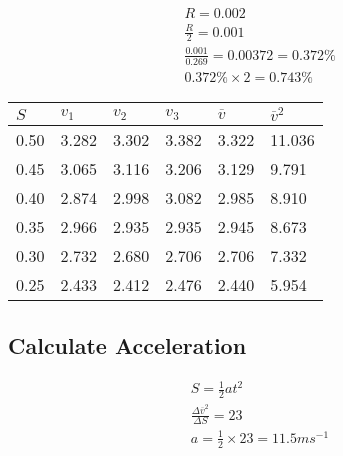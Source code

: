 \documentclass{article}
\begin{document}
\begin{gather}
	R = 0.002 \\
	\frac{R}{2} = 0.001 \\
    \frac{0.001}{0.269} = 0.00372 = 0.372\% \\
	0.372\% \times 2 = 0.743\%
\end{gather}

\begin{center}
    \begin{tabular}{l|l|l|l|l|l}
     $S$ & $v_1$ & $v_2$ & $v_3$ & $\overline{v}$ & ${\overline{v}}^2$\\ \hline
     0.50 & 3.282 & 3.302 & 3.382 & 3.322 & 11.036 \\
     0.45 & 3.065 & 3.116 & 3.206 & 3.129 & 9.791 \\
     0.40 & 2.874 & 2.998 & 3.082 & 2.985 & 8.910 \\
     0.35 & 2.966 & 2.935 & 2.935 & 2.945 & 8.673 \\
	 0.30 & 2.732 & 2.680 & 2.706 & 2.706 & 7.332 \\
     0.25 & 2.433 & 2.412 & 2.476 & 2.440 & 5.954 \\
    \end{tabular}
\end{center}

\begin{center}
\end{center}

\subsection{Calculate Acceleration}

\begin{gather}
	S = \frac{1}{2} at^2 \\
	\frac{\Delta \overline{v}^2}{\Delta{S}} = 23 \\
	a = \frac{1}{2} \times 23 = 11.5 \si{ms^{-1}}
\end{gather}
\end{document}
